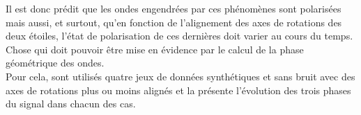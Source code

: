 \begin{figure}[h]
	
\end{figure}

Il est donc prédit que les ondes engendrées par ces phénomènes sont polarisées mais aussi, et surtout, qu'en fonction de l'alignement des axes de rotations des deux étoiles, l'état de polarisation de ces dernières doit varier au cours du temps. Chose qui doit pouvoir être mise en évidence par le calcul de la phase géométrique des ondes.
\\

Pour cela, sont utilisés quatre jeux de données synthétiques et sans bruit avec des axes de rotations plus ou moins alignés et la  présente l’évolution des trois phases du signal dans chacun des cas.
\\
